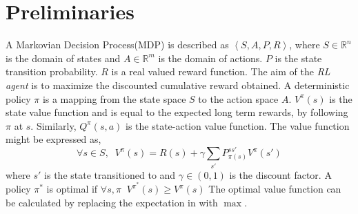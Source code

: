 \documentclass[wcp]{jmlr}
\begin{document}
\section{Preliminaries}
\label{sec:prelims}
A Markovian Decision Process(MDP) is described as $\left\langle S,A,P,R\right\rangle$, where $S\in \mathbb{R}^n$ is the domain of states and $A\in \mathbb{R}^m$ is the domain of actions. $P$ is the state transition probability. $R$ is a real valued reward function. The aim of the \textit{RL agent} is to maximize the discounted cumulative reward obtained.
A deterministic policy $\pi$ is a mapping from the state space $S$ to the action space $A$. $V^\pi(s)$ is the state value function and is equal to the expected long term rewards, by following $\pi$ at $s$. Similarly, $Q^\pi(s,a)$ is the state-action value function. The value function might be expressed as,
\begin{equation}
\label{eq:Vbell}
\forall s \in S,\;\; V^\pi(s) = R(s) + \gamma \sum_{s'}P^{ss'}_{\pi(s)}V^\pi(s')
\end{equation}
where $s'$ is the state transitioned to and $\gamma \in \left(0,1\right)$ is the discount factor. A policy $\pi^*$ is optimal if $ \forall s,\pi\;\; V^{\pi^*}(s)\geq V^\pi(s) $ The optimal value function can be calculated by replacing the expectation in  with $\max$.
\end{document}

